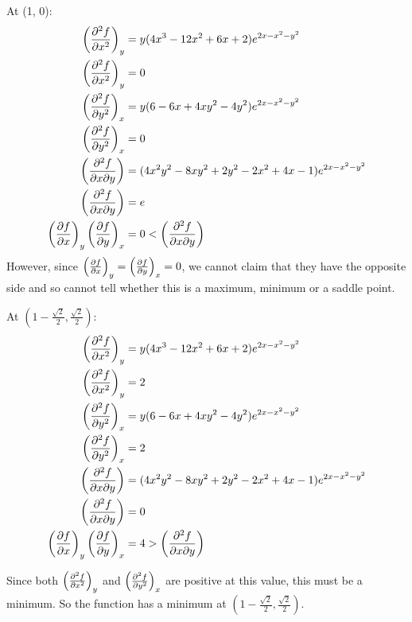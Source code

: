 \documentclass[10pt,\jkfside,a4paper]{article}
\begin{document}
\begin{enumerate}
\begin{enumerate}
At (1, 0):
\begin{equation}
\begin{split}
\left(\pdv[2]{f}{x}\right)_y &= y(4x^3 - 12x^{2} + 6x + 2)e^{2x - x^{2} - y^{2}} \\
\left(\pdv[2]{f}{x}\right)_y &= 0 \\
\left(\pdv[2]{f}{y}\right)_x &= y(6 - 6x + 4xy^{2} - 4y^{2})e^{2x - x^{2} - y^{2}} \\
\left(\pdv[2]{f}{y}\right)_x &= 0 \\
\left(\pdv[2]{f}{x}{y}\right) &= (4x^{2}y^{2} - 8xy^{2} + 2y^{2} - 2x^{2} + 4x - 1)e^{2x - x^{2} - y^{2}}\\
\left(\pdv[2]{f}{x}{y}\right) &= e \\
\left(\pdv{f}{x}\right)_y \left(\pdv{f}{y}\right)_x &= 0 < \left(\pdv[2]{f}{x}{y}\right) \\
\end{split}
\end{equation}
However, since $\left(\pdv{f}{x}\right)_y = \left(\pdv{f}{y}\right)_x = 0$, we cannot 
claim that they have the opposite side and so cannot tell whether this is a maximum, 
minimum or a saddle point.

At $(1 - \frac{\sqrt{2}}{2}, \frac{\sqrt{2}}{2})$:
\begin{equation}
\begin{split}
\left(\pdv[2]{f}{x}\right)_y &= y(4x^3 - 12x^{2} + 6x + 2)e^{2x - x^{2} - y^{2}} \\
\left(\pdv[2]{f}{x}\right)_y &= 2 \\
\left(\pdv[2]{f}{y}\right)_x &= y(6 - 6x + 4xy^{2} - 4y^{2})e^{2x - x^{2} - y^{2}} \\
\left(\pdv[2]{f}{y}\right)_x &= 2 \\
\left(\pdv[2]{f}{x}{y}\right) &= (4x^{2}y^{2} - 8xy^{2} + 2y^{2} - 2x^{2} + 4x - 1)e^{2x - x^{2} - y^{2}}\\
\left(\pdv[2]{f}{x}{y}\right) &= 0 \\
\left(\pdv{f}{x}\right)_y \left(\pdv{f}{y}\right)_x &= 4 > \left(\pdv[2]{f}{x}{y}\right) \\
\end{split}
\end{equation}

Since both $\left(\pdv[2]{f}{x}\right)_y$ and $\left(\pdv[2]{f}{y}\right)_x$ are positive 
at this value, this must be a minimum. So the function has a minimum at $(1 - \frac{\sqrt{2}}{2}, \frac{\sqrt{2}}{2})$.


\end{enumerate}
\end{enumerate}
\end{document}
